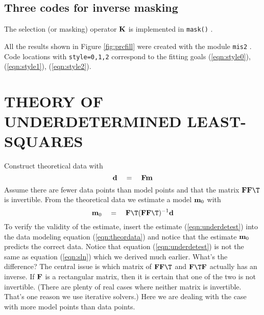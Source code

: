 \subsection{Three codes for inverse masking}
The selection (or masking) operator $\bold K$ is
implemented in
\texttt{mask()} .

All the results shown in Figure \ref{fig:prcfill}
were created with the module
\texttt{mis2} .
Code locations with \texttt{style=0,1,2}
correspond to the fitting goals
(\ref{eqn:style0}), (\ref{eqn:style1}), (\ref{eqn:style2}).
\par



\section{THEORY OF UNDERDETERMINED LEAST-SQUARES}
Construct theoretical data with
\begin{equation}
         \bold d \quad =\quad \bold F \bold m
        \label{eqn:theordata}
\end{equation}
Assume there are fewer data points than model points
and that the matrix $\bold F \bold F\T$ is invertible.
From the theoretical data we estimate a model $\bold m_0$ with
\begin{equation}
         \bold m_0 \eq \bold F\T (\bold F \bold F\T)^{-1} \bold d
        \label{eqn:underdetest}
\end{equation}
To verify the validity of the estimate,
insert the estimate (\ref{eqn:underdetest}) into the
data modeling equation (\ref{eqn:theordata}) and notice
that the estimate $\bold m_0$ predicts the correct data.
Notice that equation
(\ref{eqn:underdetest}) is not the same
as equation (\ref{eqn:sln}) which we derived much earlier.
What's the difference?
The central issue is which matrix of
$\bold F \bold F\T$ and
$\bold F\T \bold F$ actually has an inverse.
If $\bold F$ is a rectangular matrix,
then it is certain that one of the two is not invertible.
(There are plenty of real cases where neither matrix is invertible.
That's one reason we use iterative solvers.)
Here we are dealing with the case with more model points than data points.

